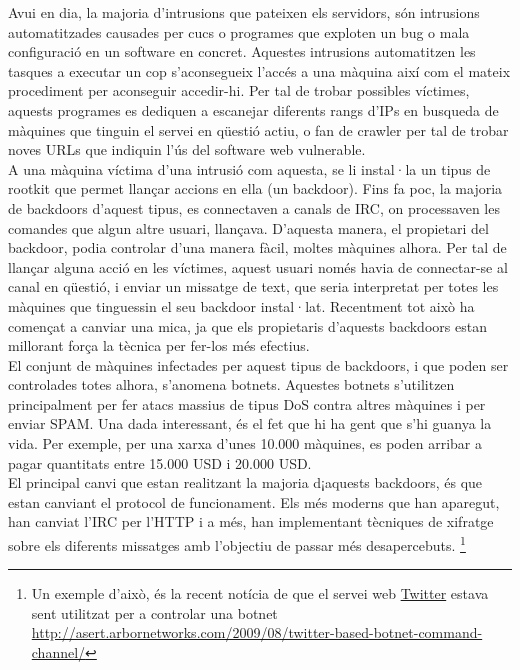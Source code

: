 Avui en dia, la majoria d'intrusions que pateixen els servidors, són intrusions automatitzades causades per cucs o 
programes que exploten un bug o mala configuració en un software en concret. Aquestes intrusions automatitzen les 
tasques a executar un cop s'aconsegueix l'accés a una màquina així com el mateix procediment per aconseguir accedir-hi. 
Per tal de trobar possibles víctimes, aquests programes
es dediquen a escanejar diferents rangs d'IPs en busqueda de màquines que tinguin el servei en qüestió actiu, o 
fan de crawler per tal de trobar noves URLs que indiquin l'ús del software web vulnerable. \\

A una màquina víctima d'una intrusió com aquesta, se li instal·la un tipus de rootkit que permet llançar accions en 
ella (un backdoor). Fins fa poc, la majoria de backdoors d'aquest tipus,  es connectaven a canals de IRC, on 
processaven les comandes que algun altre usuari, llançava. D'aquesta manera, el propietari del backdoor, podia controlar 
d'una manera fàcil, moltes màquines alhora. Per tal de llançar alguna acció en les víctimes, aquest usuari només havia de 
connectar-se al canal en qüestió, i 
enviar un missatge de text, que seria interpretat per totes les màquines que tinguessin el seu backdoor instal·lat. 
Recentment tot això ha començat a canviar una mica, ja que els propietaris d'aquests backdoors estan millorant força la tècnica
per fer-los més efectius. \\

El conjunt de màquines infectades per aquest tipus de backdoors, i que poden ser controlades totes alhora, s'anomena
botnets. Aquestes botnets s'utilitzen principalment per fer atacs massius de tipus DoS contra altres màquines i per enviar SPAM. 
Una dada interessant, és el fet que hi ha gent que s'hi guanya la vida. Per exemple, per una xarxa d'unes 10.000 màquines,
es poden arribar a pagar quantitats entre 15.000 USD i 20.000 USD. \\

El principal canvi que estan realitzant la majoria d¡aquests backdoors, és que estan canviant el protocol de funcionament. Els
més moderns que han aparegut, han canviat l'IRC per l'HTTP i a més, han implementant tècniques de xifratge sobre els diferents 
missatges amb l'objectiu de passar més desapercebuts. \footnote{Un exemple d'això, és la recent notícia de que el servei web 
\href{http://twitter.com/}{Twitter} estava sent utilitzat per a controlar una botnet \url{http://asert.arbornetworks.com/2009/08/twitter-based-botnet-command-channel/}} \\

